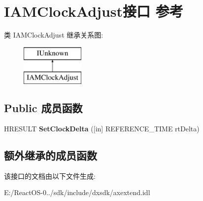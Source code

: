 \hypertarget{interface_i_a_m_clock_adjust}{}\section{I\+A\+M\+Clock\+Adjust接口 参考}
\label{interface_i_a_m_clock_adjust}
类 I\+A\+M\+Clock\+Adjust 继承关系图\+:\begin{figure}[H]
\begin{center}
\leavevmode
\includegraphics[height=2.000000cm]{interface_i_a_m_clock_adjust}
\end{center}
\end{figure}
\subsection*{Public 成员函数}
\begin{DoxyCompactItemize}
\item 
\mbox{\label{interface_i_a_m_clock_adjust_a4f249526d59bac38d8e5a29e1ce51861}} 
H\+R\+E\+S\+U\+LT {\bfseries Set\+Clock\+Delta} (\mbox{[}in\mbox{]} R\+E\+F\+E\+R\+E\+N\+C\+E\+\_\+\+T\+I\+ME rt\+Delta)
\end{DoxyCompactItemize}
\subsection*{额外继承的成员函数}


该接口的文档由以下文件生成\+:\begin{DoxyCompactItemize}
\item 
E\+:/\+React\+O\+S-\/0../sdk/include/dxsdk/axextend.\+idl\end{DoxyCompactItemize}
